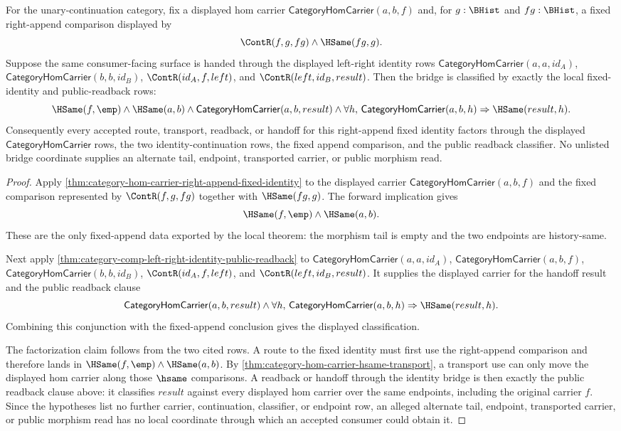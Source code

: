 \begin{lemma}
\label{lem:category-hom-carrier-right-append-fixed-identity-bridge-determinacy}
For the unary-continuation category, fix a displayed hom carrier
$\mathsf{CategoryHomCarrier}(a,b,f)$ and, for $g:\BHist$ and $fg:\BHist$,
a fixed right-append comparison displayed by
$$
\ContR(f,g,fg)\wedge\HSame(fg,g).
$$
Suppose the same consumer-facing surface is handed through the displayed
left-right identity rows
$\mathsf{CategoryHomCarrier}(a,a,id_A)$,
$\mathsf{CategoryHomCarrier}(b,b,id_B)$,
$\ContR(id_A,f,left)$, and $\ContR(left,id_B,result)$. Then the bridge is
classified by exactly the local fixed-identity and public-readback rows:
$$
\HSame(f,\emp)\wedge\HSame(a,b)\wedge
\mathsf{CategoryHomCarrier}(a,b,result)\wedge
\forall h,\,
\mathsf{CategoryHomCarrier}(a,b,h)\Rightarrow\HSame(result,h).
$$
Consequently every accepted route, transport, readback, or handoff for this
right-append fixed identity factors through the displayed
$\mathsf{CategoryHomCarrier}$ rows, the two identity-continuation rows, the
fixed append comparison, and the public readback classifier. No unlisted bridge
coordinate supplies an alternate tail, endpoint, transported carrier, or public
morphism read.
\end{lemma}
\begin{proof}
Apply \autoref{thm:category-hom-carrier-right-append-fixed-identity} to the
displayed carrier $\mathsf{CategoryHomCarrier}(a,b,f)$ and the fixed comparison
represented by $\ContR(f,g,fg)$ together with $\HSame(fg,g)$. The forward
implication gives
$$
\HSame(f,\emp)\wedge\HSame(a,b).
$$
These are the only fixed-append data exported by the local theorem: the
morphism tail is empty and the two endpoints are history-same.

Next apply \autoref{thm:category-comp-left-right-identity-public-readback} to
$\mathsf{CategoryHomCarrier}(a,a,id_A)$,
$\mathsf{CategoryHomCarrier}(a,b,f)$,
$\mathsf{CategoryHomCarrier}(b,b,id_B)$,
$\ContR(id_A,f,left)$, and $\ContR(left,id_B,result)$. It supplies the displayed
carrier for the handoff result and the public readback clause
$$
\mathsf{CategoryHomCarrier}(a,b,result)\wedge
\forall h,\,
\mathsf{CategoryHomCarrier}(a,b,h)\Rightarrow\HSame(result,h).
$$
Combining this conjunction with the fixed-append conclusion gives the displayed
classification.

The factorization claim follows from the two cited rows. A route to the fixed
identity must first use the right-append comparison and therefore lands in
$\HSame(f,\emp)\wedge\HSame(a,b)$. By
\autoref{thm:category-hom-carrier-hsame-transport}, a transport use can only
move the displayed hom carrier along those $\hsame$ comparisons. A readback or
handoff through the identity bridge is then exactly the public readback clause
above: it classifies $result$ against every displayed hom carrier over the same
endpoints, including the original carrier $f$. Since the hypotheses list no
further carrier, continuation, classifier, or endpoint row, an alleged alternate
tail, endpoint, transported carrier, or public morphism read has no local
coordinate through which an accepted consumer could obtain it.
\end{proof}

